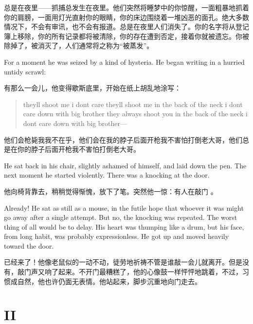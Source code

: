 \begin{paracol}{2}
总是在夜里——抓捕总发生在夜里。他们突然将睡梦中的你惊醒，一面粗暴地抓着你的肩膀，一面用灯光直射你的眼睛，你的床边围绕着一堆凶恶的面孔。绝大多数情况下，不会有审讯，也不会有报道。总是在夜里人们消失了。你的名字将从登记簿上移除，你的所有记录都将被清除，你的存在遭到否定，接着你就被遗忘。你被除掉了，被消灭了，人们通常将之称为``被蒸发''。

\switchcolumn*

For a moment he was seized by a kind of hysteria. He began writing in a
hurried untidy scrawl:

\switchcolumn

有那么一会儿，他变得歇斯底里，开始在纸上胡乱地涂写：

\switchcolumn*

\begin{quotation}
theyll shoot me i dont care theyll shoot me in the back of the
neck i dont care down with big brother they always shoot you in the back
of the neck i dont care down with big brother---
\end{quotation}

\switchcolumn

他们会枪毙我我不在乎，他们会在我的脖子后面开枪我不害怕打倒老大哥，他们总是在你的脖子后面开枪我不害怕打倒老大哥。

\switchcolumn*

He sat back in his chair, slightly ashamed of himself, and laid down the
pen. The next moment he started violently. There was a knocking at the
door.

\switchcolumn

他向椅背靠去，稍稍觉得惭愧，放下了笔。突然他一惊：有人在敲门 。

\switchcolumn*

Already! He sat as still as a mouse, in the futile hope that whoever it
was might go away after a single attempt. But no, the knocking was
repeated. The worst thing of all would be to delay. His heart was
thumping like a drum, but his face, from long habit, was probably
expressionless. He got up and moved heavily toward the door.

\switchcolumn

已经来了！他像老鼠似的一动不动，徒劳地祈祷不管是谁敲一会儿就离开。但是没有，敲门声又响了起来。不开门最糟糕了，他的心像鼓一样怦怦地跳着，不过，习惯成自然，他也许仍面无表情。他站起来，脚步沉重地向门走去。

\switchcolumn*


\section{II}\label{ii}


\end{paracol}
